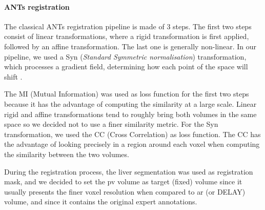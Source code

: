 \paragraph{ANTs registration}\label{tcia-db-ants-registration}

The classical ANTs registration pipeline is made of 3 steps. The first
two steps consist of linear transformations, where a rigid
transformation is first applied, followed by an affine transformation.
The last one is generally non-linear. In our pipeline,
we used a Syn (\emph{Standard Symmetric normalisation}) transformation, which
processes a gradient field, determining how each point of the space will
shift \cite{Avants2008}.

The MI (Mutual Information) was used as loss function for the first two
steps because it has the advantage of computing the similarity at a
large scale. Linear rigid and affine transformations tend to roughly bring both volumes
in the same space so we decided not to use a finer similarity metric. For the Syn
transformation, we used the CC (Cross Correlation) as loss function. The CC
has the advantage of looking precisely in a region around each voxel
when computing the similarity between the two volumes.

During the registration process, the liver segmentation was used as
registration mask, and we decided to set the \ac{pv} volume as target (fixed)
volume since it usually presents the finer voxel resolution when
compared to \ac{ar} (or DELAY) volume, and since it contains the original
expert annotations.

\begin{figure}
 \label{regisPipeline}
\end{figure}

